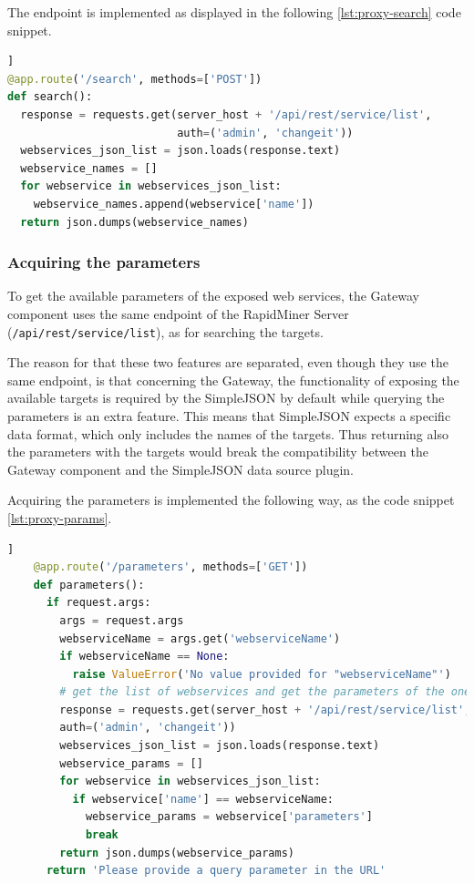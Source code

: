 The endpoint is implemented as displayed in the following \ref{lst:proxy-search} code snippet. 

\begin{minipage}{\linewidth}
\begin{lstlisting}[language=Python, caption={Get the names of the web services}, label={lst:proxy-search}]]
@app.route('/search', methods=['POST'])
def search():
  response = requests.get(server_host + '/api/rest/service/list',
                          auth=('admin', 'changeit'))
  webservices_json_list = json.loads(response.text)
  webservice_names = []
  for webservice in webservices_json_list:
    webservice_names.append(webservice['name'])
  return json.dumps(webservice_names)
\end{lstlisting}
\end{minipage}
\subsubsection{Acquiring the parameters}

To get the available parameters of the exposed web services, the Gateway component uses the same endpoint of the RapidMiner Server (\texttt{/api/rest/service/list}), as for searching the targets.

The reason for that these two features are separated, even though they use the same endpoint, is that concerning the Gateway, the functionality of exposing the available targets is required by the SimpleJSON by default while querying the parameters is an extra feature. This means that SimpleJSON expects a specific data format, which only includes the names of the targets. Thus returning also the parameters with the targets would break the compatibility between the Gateway component and the SimpleJSON data source plugin.

Acquiring the parameters is implemented the following way, as the code snippet \ref{lst:proxy-params}.

\begin{minipage}{\linewidth}
	\begin{lstlisting}[language=Python, caption={Get the parameters for a given web service}, label={lst:proxy-params}]]
	@app.route('/parameters', methods=['GET'])
	def parameters():
	  if request.args:
	    args = request.args
	    webserviceName = args.get('webserviceName')
	    if webserviceName == None:
	      raise ValueError('No value provided for "webserviceName"')
	    # get the list of webservices and get the parameters of the one with the name provided in the query
	    response = requests.get(server_host + '/api/rest/service/list',
	    auth=('admin', 'changeit'))
	    webservices_json_list = json.loads(response.text)
	    webservice_params = []
	    for webservice in webservices_json_list:
	      if webservice['name'] == webserviceName:
	        webservice_params = webservice['parameters']
	        break
	    return json.dumps(webservice_params)
	  return 'Please provide a query parameter in the URL'
	\end{lstlisting}
\end{minipage}

